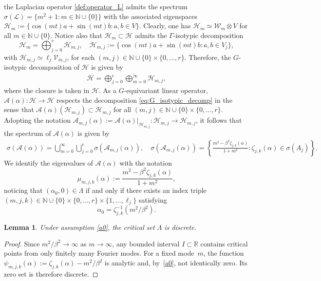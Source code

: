 \documentclass[twoside]{article}%
\def\bn{{\mathbb{N}}}
\def\br{\mathbb R}
\newtheorem{lemma}[theorem]{Lemma}
\begin{document}
the Laplacian operator \eqref{def:operator_L} admits the spectrum $\sigma(\mathscr L) = \{m^2+1 : m \in \bn \cup \{0\} \}$ with the associated eigenspaces $\mathscr H_{m} := \{\cos(mt)a + \sin(mt)b : a,b \in V \}$. Clearly, one has $\mathscr H_{m} \simeq \mathcal W_m \otimes V$ for all $m \in \bn \cup \{0\}$. Notice also that $\mathscr H_m \subset \mathscr H$ admits the $\Gamma$-isotypic decomposition
\[
\mathscr H_m = \bigoplus_{j=0}^r \mathscr H_{m,j}, \quad \mathscr H_{m,j}:= \{\cos(mt)a + \sin(mt)b : a,b \in V_j \},
\]
with $\mathscr H_{m,j} \simeq \ell_j \mathcal V_{m,j}$, for each $(m,j) \in \bn \cup \{0\} \times \{0,\ldots,r\}$. Therefore, the $G$-isotypic decomposition of $\mathscr H$ is given by
\begin{align} \label{eq:G_isotypic_decomp}
   \mathscr H = \overline{\bigoplus_{j=0}^r \bigoplus\limits_{m=0}^\infty \mathscr H_{m,j}},
\end{align}
where the closure is taken in $\mathscr H$. As a $G$-equivariant linear operator, $\mathscr A(\alpha):\mathscr H \rightarrow \mathscr H$ respects the decomposition \eqref{eq:G_isotypic_decomp} in the sense that
$\mathscr A(\alpha)(\mathscr H_{m,j}) \subset \mathscr H_{m,j}$ for all $(m,j) \in \bn \cup \{0\} \times \{0,\ldots,r\}$. Adopting the notation $\mathscr A_{m,j}(\alpha) := \mathscr A(\alpha)|_{\mathscr H_{m,j}}: \mathscr H_{m,j} \rightarrow \mathscr H_{m,j}$, it follows that the spectrum of $\mathscr A(\alpha)$ is given by
\begin{align*} %
 \sigma (\mathscr A(\alpha))= \bigcup\limits_{m=0}^{\infty} \bigcup_{j=0}^r \sigma(\mathscr A_{m,j}(\alpha)), \quad \sigma(\mathscr A_{m,j}(\alpha)) = \left\{ \frac{m^2 - \beta^2 \zeta_{j,k}(\alpha)}{1+m^2} : \zeta_{j,k}(\alpha) \in \sigma(A_j)\right\}.
\end{align*}
We identify the eigenvalues of $\mathscr A(\alpha)$ with the notation
\[
\mu_{m,j,k}(\alpha) := \frac{m^2 - \beta^2 \zeta_{j,k}(\alpha)}{1+m^2},
\]
noticing that $(\alpha_0,0) \in \Lambda$ if and only if there exists an index triple $(m,j,k) \in \bn \cup \{0\} \times \{0,\ldots,r\} \times \{1,\ldots,\ell_j\}$ satisfying
\[
\alpha_0 =\zeta_{j,k}^{-1}(m^2/\beta^2).
\]
\begin{lemma}
Under assumption \ref{a0}, the critical set $\Lambda$ is discrete.
\end{lemma}
\begin{proof}
Since $m^2/\beta^2 \to \infty$ as $m \to \infty$, any bounded interval $I \subset \br$ contains critical points from only finitely many Fourier modes.  For a fixed mode~$m$, the function
$\psi_{m,j,k}(\alpha) := \zeta_{j,k}(\alpha) - m^2/\beta^2$ is analytic and, by~\ref{a0}, not identically zero. Its zero set is therefore discrete.
\end{proof}
\end{document}
